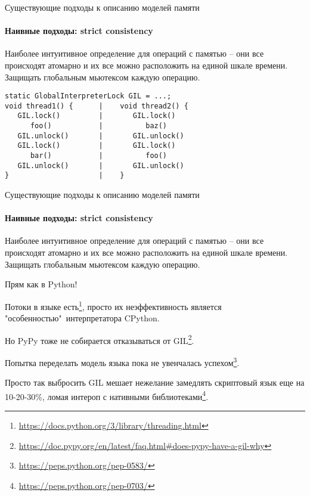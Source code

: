 \begin{frame}{Существующие подходы к описанию моделей памяти}
\framesubtitle{Наивные подходы: strict consistency}

Наиболее интуитивное определение для операций с памятью -- они все происходят атомарно и их все можно расположить на единой шкале времени.
Защищать глобальным мьютексом каждую операцию.

\begin{lstlisting}
static GlobalInterpreterLock GIL = ...;
void thread1() {      |    void thread2() {                                   
   GIL.lock()         |       GIL.lock()
      foo()           |          baz()                           
   GIL.unlock()       |       GIL.unlock()
   GIL.lock()         |       GIL.lock()
      bar()           |          foo()                           
   GIL.unlock()       |       GIL.unlock()
}                     |    }                    
\end{lstlisting}	

\end{frame}

\begin{frame}{Существующие подходы к описанию моделей памяти}
\framesubtitle{Наивные подходы: strict consistency}

Наиболее интуитивное определение для операций с памятью -- они все происходят атомарно и их все можно расположить на единой шкале времени.
Защищать глобальным мьютексом каждую операцию.
 
\pause
Прям как в Python!

\pause
Потоки в языке есть\footnote<3->{\tiny\url{https://docs.python.org/3/library/threading.html}}, просто их неэффективность является "особенностью"\ интерпретатора CPython.

\pause
Но PyPy тоже не собирается отказываться от GIL\footnote<4->{\tiny\url{https://doc.pypy.org/en/latest/faq.html#does-pypy-have-a-gil-why}}.

\pause
Попытка переделать модель языка пока не увенчалась успехом\footnote<5->{\tiny\url{https://peps.python.org/pep-0583/}}.

\pause
Просто так выбросить GIL мешает нежелание замедлять скриптовый язык еще на 10-20-30\%, ломая интероп с нативными библиотеками\footnote<6->{\tiny\url{https://peps.python.org/pep-0703/}}.
\end{frame}


